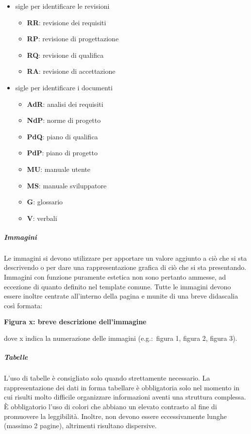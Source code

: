 \documentclass[../norme-di-progetto.tex]{subfiles}
\begin{document}
\begin{itemize}
  \item sigle per identificare le revisioni
        \begin{itemize}
          \item \textbf{RR}: revisione dei requisiti
          \item \textbf{RP}: revisione di progettazione
          \item \textbf{RQ}: revisione di qualifica
          \item \textbf{RA}: revisione di accettazione
        \end{itemize}
  \item sigle per identificare i documenti
        \begin{itemize}
          \item \textbf{AdR}: analisi dei requisiti
          \item \textbf{NdP}: norme di progetto
          \item \textbf{PdQ}: piano di qualifica
          \item \textbf{PdP}: piano di progetto
          \item \textbf{MU}: manuale utente
          \item \textbf{MS}: manuale sviluppatore
          \item \textbf{G}: glossario
          \item \textbf{V}: verbali
        \end{itemize}
\end{itemize}

\subparagraph{Immagini}%
\label{subp:immagini}
Le immagini si devono utilizzare per apportare un valore aggiunto a ciò che si sta descrivendo o per dare una rappresentazione grafica di ciò che si sta presentando.
Immagini con funzione puramente estetica non sono pertanto ammesse, ad eccezione di quanto definito nel template comune.
Tutte le immagini devono essere inoltre centrate all'interno della pagina e munite di una breve didascalia così formata:
\begin{center}
  \textbf{Figura x: breve descrizione dell'immagine}
\end{center}
dove x indica la numerazione delle immagini (e.g.:\ figura 1, figura 2, figura 3).

\subparagraph{Tabelle}%
\label{subp:tabelle}
L'uso di tabelle è consigliato solo quando strettamente necessario. La rappresentazione dei dati in forma tabellare è obbligatoria solo nel momento in cui risulti molto difficile organizzare informazioni aventi una struttura complessa. È obbligatorio l'uso di colori che abbiano un elevato contrasto al fine di promuovere la leggibilità. Inoltre, non devono essere eccessivamente lunghe (massimo 2 pagine), altrimenti risultano dispersive.
\end{document}
